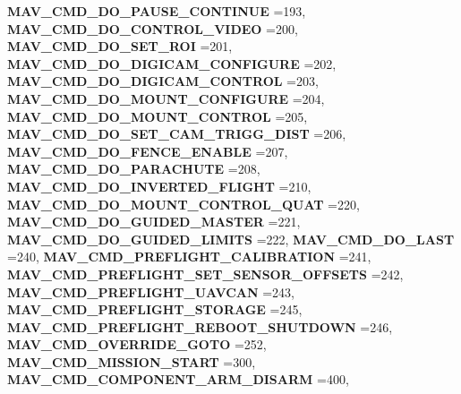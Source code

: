 \begin{DoxyCompactItemize}
\textbf{ M\+A\+V\+\_\+\+C\+M\+D\+\_\+\+D\+O\+\_\+\+P\+A\+U\+S\+E\+\_\+\+C\+O\+N\+T\+I\+N\+UE} =193, 
\textbf{ M\+A\+V\+\_\+\+C\+M\+D\+\_\+\+D\+O\+\_\+\+C\+O\+N\+T\+R\+O\+L\+\_\+\+V\+I\+D\+EO} =200, 
\textbf{ M\+A\+V\+\_\+\+C\+M\+D\+\_\+\+D\+O\+\_\+\+S\+E\+T\+\_\+\+R\+OI} =201, 
\newline
\textbf{ M\+A\+V\+\_\+\+C\+M\+D\+\_\+\+D\+O\+\_\+\+D\+I\+G\+I\+C\+A\+M\+\_\+\+C\+O\+N\+F\+I\+G\+U\+RE} =202, 
\textbf{ M\+A\+V\+\_\+\+C\+M\+D\+\_\+\+D\+O\+\_\+\+D\+I\+G\+I\+C\+A\+M\+\_\+\+C\+O\+N\+T\+R\+OL} =203, 
\textbf{ M\+A\+V\+\_\+\+C\+M\+D\+\_\+\+D\+O\+\_\+\+M\+O\+U\+N\+T\+\_\+\+C\+O\+N\+F\+I\+G\+U\+RE} =204, 
\textbf{ M\+A\+V\+\_\+\+C\+M\+D\+\_\+\+D\+O\+\_\+\+M\+O\+U\+N\+T\+\_\+\+C\+O\+N\+T\+R\+OL} =205, 
\newline
\textbf{ M\+A\+V\+\_\+\+C\+M\+D\+\_\+\+D\+O\+\_\+\+S\+E\+T\+\_\+\+C\+A\+M\+\_\+\+T\+R\+I\+G\+G\+\_\+\+D\+I\+ST} =206, 
\textbf{ M\+A\+V\+\_\+\+C\+M\+D\+\_\+\+D\+O\+\_\+\+F\+E\+N\+C\+E\+\_\+\+E\+N\+A\+B\+LE} =207, 
\textbf{ M\+A\+V\+\_\+\+C\+M\+D\+\_\+\+D\+O\+\_\+\+P\+A\+R\+A\+C\+H\+U\+TE} =208, 
\textbf{ M\+A\+V\+\_\+\+C\+M\+D\+\_\+\+D\+O\+\_\+\+I\+N\+V\+E\+R\+T\+E\+D\+\_\+\+F\+L\+I\+G\+HT} =210, 
\newline
\textbf{ M\+A\+V\+\_\+\+C\+M\+D\+\_\+\+D\+O\+\_\+\+M\+O\+U\+N\+T\+\_\+\+C\+O\+N\+T\+R\+O\+L\+\_\+\+Q\+U\+AT} =220, 
\textbf{ M\+A\+V\+\_\+\+C\+M\+D\+\_\+\+D\+O\+\_\+\+G\+U\+I\+D\+E\+D\+\_\+\+M\+A\+S\+T\+ER} =221, 
\textbf{ M\+A\+V\+\_\+\+C\+M\+D\+\_\+\+D\+O\+\_\+\+G\+U\+I\+D\+E\+D\+\_\+\+L\+I\+M\+I\+TS} =222, 
\textbf{ M\+A\+V\+\_\+\+C\+M\+D\+\_\+\+D\+O\+\_\+\+L\+A\+ST} =240, 
\newline
\textbf{ M\+A\+V\+\_\+\+C\+M\+D\+\_\+\+P\+R\+E\+F\+L\+I\+G\+H\+T\+\_\+\+C\+A\+L\+I\+B\+R\+A\+T\+I\+ON} =241, 
\textbf{ M\+A\+V\+\_\+\+C\+M\+D\+\_\+\+P\+R\+E\+F\+L\+I\+G\+H\+T\+\_\+\+S\+E\+T\+\_\+\+S\+E\+N\+S\+O\+R\+\_\+\+O\+F\+F\+S\+E\+TS} =242, 
\textbf{ M\+A\+V\+\_\+\+C\+M\+D\+\_\+\+P\+R\+E\+F\+L\+I\+G\+H\+T\+\_\+\+U\+A\+V\+C\+AN} =243, 
\textbf{ M\+A\+V\+\_\+\+C\+M\+D\+\_\+\+P\+R\+E\+F\+L\+I\+G\+H\+T\+\_\+\+S\+T\+O\+R\+A\+GE} =245, 
\newline
\textbf{ M\+A\+V\+\_\+\+C\+M\+D\+\_\+\+P\+R\+E\+F\+L\+I\+G\+H\+T\+\_\+\+R\+E\+B\+O\+O\+T\+\_\+\+S\+H\+U\+T\+D\+O\+WN} =246, 
\textbf{ M\+A\+V\+\_\+\+C\+M\+D\+\_\+\+O\+V\+E\+R\+R\+I\+D\+E\+\_\+\+G\+O\+TO} =252, 
\textbf{ M\+A\+V\+\_\+\+C\+M\+D\+\_\+\+M\+I\+S\+S\+I\+O\+N\+\_\+\+S\+T\+A\+RT} =300, 
\textbf{ M\+A\+V\+\_\+\+C\+M\+D\+\_\+\+C\+O\+M\+P\+O\+N\+E\+N\+T\+\_\+\+A\+R\+M\+\_\+\+D\+I\+S\+A\+RM} =400, 
\newline

\end{DoxyCompactItemize}
